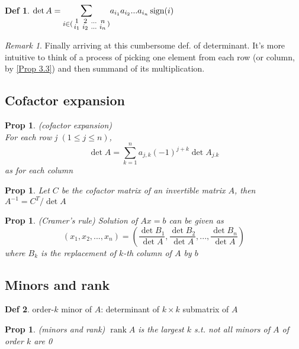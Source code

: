 \documentclass[hidelinks]{article}
\theoremstyle{definition}
\newtheorem*{defin}{Def}
\theoremstyle{plain}
\newtheorem{proposition}[theorem]{Prop}
\theoremstyle{remark}
\newtheorem*{remark}{Remark}
\DeclareMathOperator{\rank}{rank}
\DeclareMathOperator{\sign}{sign}
\begin{document}
\begin{defin}
$\det A=\mathlarger{\mathlarger{\sum\limits_{i\in (\begin{smallmatrix} 1&2&...&n\\ i_1&i_2&...&i_n \end{smallmatrix})}}}a_{i_1}a_{i_2}...a_{i_n}\sign(i)$
\end{defin}

\begin{remark}
Finally arriving at this cumbersome def. of determinant. It's more intuitive to think of a process of picking one element from each row (or column, by \autoref{Prop 3.3}) and then summand of its multiplication.
\end{remark}

\subsection{Cofactor expansion}

\begin{proposition} (cofactor expansion) \\
For each row j $\left(1\leq j\leq n\right)$,
\[
\det A=\sum_{k=1}^{n}a_{j,k}(-1)^{j+k}\det{A_{j.k}}
\]
as for each column
\end{proposition}

\begin{proposition}
Let $C$ be the cofactor matrix of an invertible matrix $A$, then $A^{-1}=C^T/\det A$
\end{proposition}

\begin{proposition} (Cramer's rule)
Solution of $Ax=b$ can be given as
\[
(x_1,x_2,...,x_n)=(\frac{\det B_1}{\det A},\frac{\det B_2}{\det A},...,\frac{\det B_n}{\det A})
\]
where $B_k$ is the replacement of $k$-th column of $A$ by $b$

\end{proposition}

\subsection{Minors and rank}

\begin{defin}
order-$k$ minor of $A$: determinant of $k\times k$ submatrix of $A$
\end{defin}

\begin{proposition} (minors and rank) $\rank A$ is the largest $k$ s.t. not all minors of $A$ of order $k$ are 0
\end{proposition}
\end{document}
